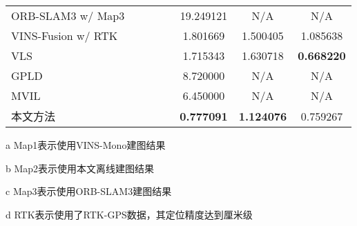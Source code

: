 \begin{table}
\begin{threeparttable}[c]
\begin{tabular}{lccccccc}
ORB-SLAM3 w/ Map3                      &                                                                            &                      &                      &                      & 19.249121         & N/A               & N/A               \\
VINS-Fusion w/  RTK &                                                                            &                      &                      &                      & 1.801669          & 1.500405          & 1.085638          \\
VLS                                    &                                                                            &                      &                      &                      & 1.715343          & 1.630718          & \cellcolor[HTML]{FFCCC9}\textbf{0.668220} \\
GPLD                                   &                                                                            &                      &                      &                      & 8.720000          & N/A               & N/A               \\
MVIL                                   &                                                                            &                      &                      &                      & 6.450000          & N/A               & N/A               \\
本文方法                                   &                                                                            &                      &                      &                      & \cellcolor[HTML]{FFCCC9}\textbf{0.777091} & \cellcolor[HTML]{FFCCC9}\textbf{1.124076} & 0.759267          \\ \bottomrule
\end{tabular}
\label{tab:loc_4seasons_of2}
\begin{tablenotes}
  \item [a] Map1表示使用VINS-Mono建图结果
  \item [b] Map2表示使用本文离线建图结果
  \item [c] Map3表示使用ORB-SLAM3建图结果
  \item [d] RTK表示使用了RTK-GPS数据，其定位精度达到厘米级
\end{tablenotes}
\end{threeparttable}
\end{table}

